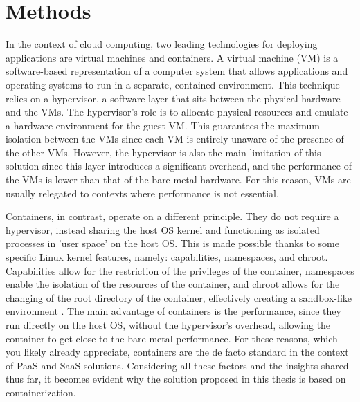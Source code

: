 
\section*{Methods}

In the context of cloud computing, two leading technologies for deploying
applications are virtual machines and containers.
A virtual machine (VM) is a software-based representation of a computer system
that allows applications and operating systems to run in a separate, contained
environment.
This technique relies on a hypervisor, a software layer that sits between the
physical hardware and the VMs.
The hypervisor's role is to allocate physical resources and emulate a hardware
environment for the guest VM.
This guarantees the maximum isolation between the VMs since each VM is entirely
unaware of the presence of the other VMs.
However, the hypervisor is also the main limitation of this solution since this
layer introduces a significant overhead, and the performance of the VMs is lower
than that of the bare metal hardware.
For this reason, VMs are usually relegated to contexts where performance is not essential.

\noindent Containers, in contrast, operate on a different principle. They do not require a
hypervisor, instead sharing the host OS kernel and functioning as isolated
processes in 'user space' on the host OS. This is made possible thanks to some
specific Linux kernel features, namely: capabilities, namespaces, and chroot.
Capabilities allow for the restriction of the privileges of the container,
namespaces enable the isolation of the resources of the container, and chroot
allows for the changing of the root directory of the container, effectively
creating a sandbox-like environment \cite{kerris2021, deochake2023}.
The main advantage of containers is the performance, since they run directly on
the host OS, without the hypervisor's overhead, allowing the container to get
close to the bare metal performance\cite{deochake2023}. For these reasons, which you likely
already appreciate, containers are the de facto standard in the context of PaaS
and SaaS solutions. Considering all these factors and the insights shared thus
far, it becomes evident why the solution proposed in this thesis is based on
containerization.

